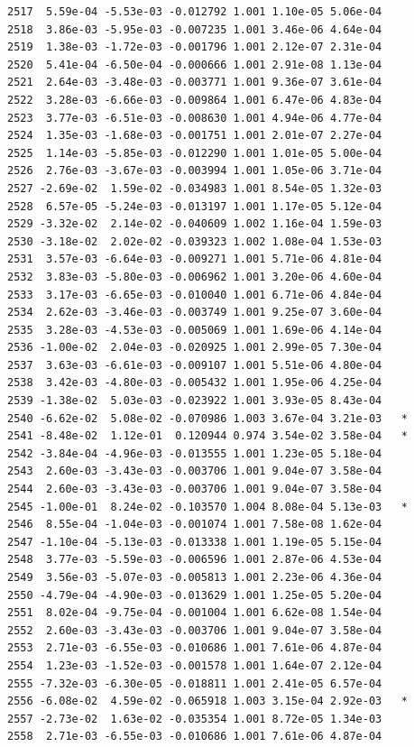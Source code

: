 \documentclass[
  letterpaper,
  DIV=11,
  numbers=noendperiod]{scrartcl}
\begin{document}
\begin{verbatim}
2517  5.59e-04 -5.53e-03 -0.012792 1.001 1.10e-05 5.06e-04    
2518  3.86e-03 -5.95e-03 -0.007235 1.001 3.46e-06 4.64e-04    
2519  1.38e-03 -1.72e-03 -0.001796 1.001 2.12e-07 2.31e-04    
2520  5.41e-04 -6.50e-04 -0.000666 1.001 2.91e-08 1.13e-04    
2521  2.64e-03 -3.48e-03 -0.003771 1.001 9.36e-07 3.61e-04    
2522  3.28e-03 -6.66e-03 -0.009864 1.001 6.47e-06 4.83e-04    
2523  3.77e-03 -6.51e-03 -0.008630 1.001 4.94e-06 4.77e-04    
2524  1.35e-03 -1.68e-03 -0.001751 1.001 2.01e-07 2.27e-04    
2525  1.14e-03 -5.85e-03 -0.012290 1.001 1.01e-05 5.00e-04    
2526  2.76e-03 -3.67e-03 -0.003994 1.001 1.05e-06 3.71e-04    
2527 -2.69e-02  1.59e-02 -0.034983 1.001 8.54e-05 1.32e-03    
2528  6.57e-05 -5.24e-03 -0.013197 1.001 1.17e-05 5.12e-04    
2529 -3.32e-02  2.14e-02 -0.040609 1.002 1.16e-04 1.59e-03    
2530 -3.18e-02  2.02e-02 -0.039323 1.002 1.08e-04 1.53e-03    
2531  3.57e-03 -6.64e-03 -0.009271 1.001 5.71e-06 4.81e-04    
2532  3.83e-03 -5.80e-03 -0.006962 1.001 3.20e-06 4.60e-04    
2533  3.17e-03 -6.65e-03 -0.010040 1.001 6.71e-06 4.84e-04    
2534  2.62e-03 -3.46e-03 -0.003749 1.001 9.25e-07 3.60e-04    
2535  3.28e-03 -4.53e-03 -0.005069 1.001 1.69e-06 4.14e-04    
2536 -1.00e-02  2.04e-03 -0.020925 1.001 2.99e-05 7.30e-04    
2537  3.63e-03 -6.61e-03 -0.009107 1.001 5.51e-06 4.80e-04    
2538  3.42e-03 -4.80e-03 -0.005432 1.001 1.95e-06 4.25e-04    
2539 -1.38e-02  5.03e-03 -0.023922 1.001 3.93e-05 8.43e-04    
2540 -6.62e-02  5.08e-02 -0.070986 1.003 3.67e-04 3.21e-03   *
2541 -8.48e-02  1.12e-01  0.120944 0.974 3.54e-02 3.58e-04   *
2542 -3.84e-04 -4.96e-03 -0.013555 1.001 1.23e-05 5.18e-04    
2543  2.60e-03 -3.43e-03 -0.003706 1.001 9.04e-07 3.58e-04    
2544  2.60e-03 -3.43e-03 -0.003706 1.001 9.04e-07 3.58e-04    
2545 -1.00e-01  8.24e-02 -0.103570 1.004 8.08e-04 5.13e-03   *
2546  8.55e-04 -1.04e-03 -0.001074 1.001 7.58e-08 1.62e-04    
2547 -1.10e-04 -5.13e-03 -0.013338 1.001 1.19e-05 5.15e-04    
2548  3.77e-03 -5.59e-03 -0.006596 1.001 2.87e-06 4.53e-04    
2549  3.56e-03 -5.07e-03 -0.005813 1.001 2.23e-06 4.36e-04    
2550 -4.79e-04 -4.90e-03 -0.013629 1.001 1.25e-05 5.20e-04    
2551  8.02e-04 -9.75e-04 -0.001004 1.001 6.62e-08 1.54e-04    
2552  2.60e-03 -3.43e-03 -0.003706 1.001 9.04e-07 3.58e-04    
2553  2.71e-03 -6.55e-03 -0.010686 1.001 7.61e-06 4.87e-04    
2554  1.23e-03 -1.52e-03 -0.001578 1.001 1.64e-07 2.12e-04    
2555 -7.32e-03 -6.30e-05 -0.018811 1.001 2.41e-05 6.57e-04    
2556 -6.08e-02  4.59e-02 -0.065918 1.003 3.15e-04 2.92e-03   *
2557 -2.73e-02  1.63e-02 -0.035354 1.001 8.72e-05 1.34e-03    
2558  2.71e-03 -6.55e-03 -0.010686 1.001 7.61e-06 4.87e-04    

\end{verbatim}
\end{document}
